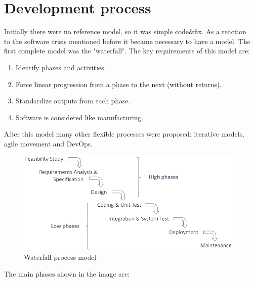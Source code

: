 \documentclass[12pt, a4paper]{report}
\begin{document}
    \section{Development process}
    Initially there were no reference model, so it was simple code$\&$fix. As a reaction to the software crisis mentioned before it 
    became necessary to have a model. The first complete model was the "waterfall". The key requirements of this model are:
    \begin{enumerate}
        \item Identify phases and activities.
        \item Force linear progression from a phase to the next (without returns).
        \item Standardize outputs from each phase.
        \item Software is considered like manufacturing.
    \end{enumerate}
    After this model many other flexible processes were proposed: iterative models, agile movement and DevOps.
    \begin{figure}[H]
        \centering
        \includegraphics[width=0.75\linewidth]{images/waterfall.png}
        \caption{Waterfall process model}
    \end{figure}
    The main phases shown in the image are:
\end{document}
